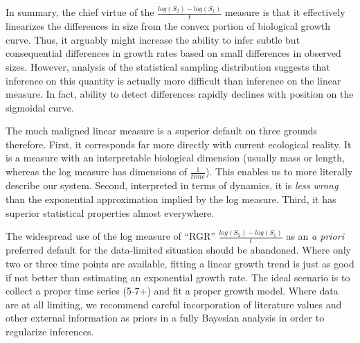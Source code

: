 \documentclass[]{article}
\begin{document}
In summary, the chief virtue of the \(\frac{log(S_2) - log(S_1)}{t}\)
measure is that it effectively linearizes the differences in size from
the convex portion of biological growth curve. Thus, it arguably might
increase the ability to infer subtle but consequential differences in
growth rates based on small differences in observed sizes. However,
analysis of the statistical sampling distribution suggests that
inference on this quantity is actually more difficult than inference on
the linear measure. In fact, ability to detect differences rapidly
declines with position on the sigmoidal curve.

The much maligned linear measure is a superior default on three grounds
therefore. First, it corresponds far more directly with current
ecological reality. It is a measure with an interpretable biological
dimension (usually mass or length, whereas the log measure has
dimensions of \(\frac{1}{time}\)). This enables us to more literally
describe our system. Second, interpreted in terms of dynamics, it is
\emph{less wrong} than the exponential approximation implied by the log
measure. Third, it has superior statistical properties almost
everywhere.

The widespread use of the log measure of ``RGR''
\(\frac{log(S_2) - log(S_1)}{t}\) as an \emph{a priori} preferred
default for the data-limited situation should be abandoned. Where only
two or three time points are available, fitting a linear growth trend is
just as good if not better than estimating an exponential growth rate.
The ideal scenario is to collect a proper time series (5-7+) and fit a
proper growth model. Where data are at all limiting, we recommend
careful incorporation of literature values and other external
information as priors in a fully Bayesian analysis in order to
regularize inferences.
\end{document}
